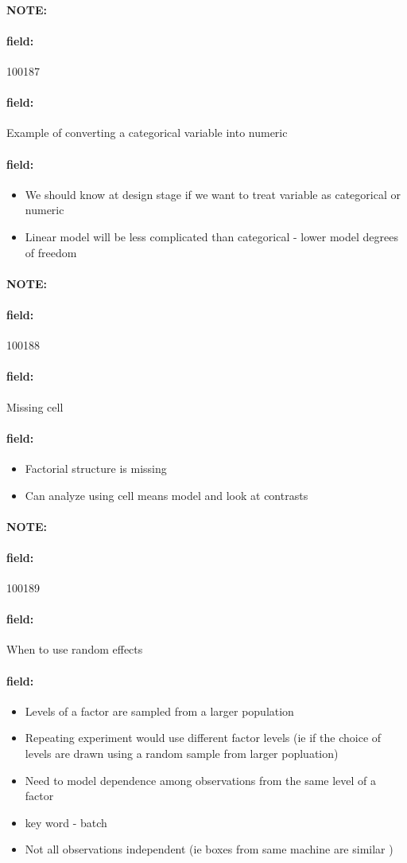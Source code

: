 \documentclass[12pt]{article}
\newenvironment{note}{\paragraph{NOTE:}}{}
\newenvironment{field}{\paragraph{field:}}{}
\begin{document}
\begin{note}
    \begin{field}
        \tiny 100187
    \end{field}
    \begin{field}
        Example of converting a categorical variable into numeric
    \end{field}
    \begin{field}
        \begin{itemize}
          \item We should know at design stage if we want to treat variable as categorical or numeric
          \item Linear model will be less complicated than categorical - lower model degrees of freedom
        \end{itemize}
    \end{field}
\end{note}


\begin{note}
    \begin{field}
        \tiny 100188
    \end{field}
    \begin{field}
        Missing cell
    \end{field}
    \begin{field}
        \begin{itemize}
          \item Factorial structure is missing
          \item Can analyze using cell means model and look at contrasts
        \end{itemize}
    \end{field}
\end{note}

\begin{note}
    \begin{field}
        \tiny 100189
    \end{field}
    \begin{field}
        When to use random effects
    \end{field}
    \begin{field}
        \begin{itemize}
          \item Levels of a factor are sampled from a larger population
          \item Repeating experiment would use different factor levels (ie if the choice of levels are drawn using a random sample from larger popluation)
          \item Need to model dependence among observations from the same level of a factor
          \item key word - batch
          \item Not all observations independent (ie boxes from same machine are similar )
        \end{itemize}
    \end{field}
\end{note}
\end{document}
